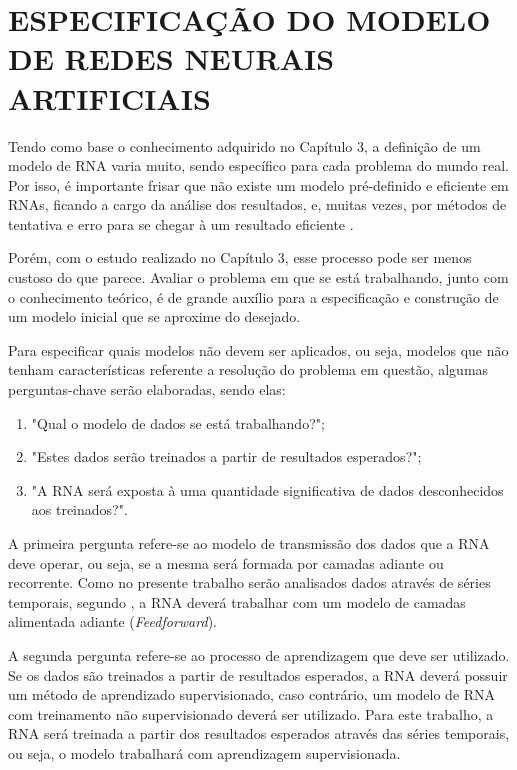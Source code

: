 \section{ESPECIFICAÇÃO DO MODELO DE REDES NEURAIS ARTIFICIAIS}\label{especifica-modelo}
Tendo como base o conhecimento adquirido no Capítulo 3, a definição de um modelo de RNA varia muito, sendo específico para cada problema do mundo real. Por isso, é importante frisar que não existe um modelo pré-definido e eficiente em RNAs, ficando a cargo da análise dos resultados, e, muitas vezes, por métodos de tentativa e erro para se chegar à um resultado eficiente \cite{haykin2000}.
 
Porém, com o estudo realizado no Capítulo 3, esse processo pode ser menos custoso do que parece. Avaliar o problema em que se está trabalhando, junto com o conhecimento teórico, é de grande auxílio para a especificação e construção de um modelo inicial que se aproxime do desejado.

Para especificar quais modelos não devem ser aplicados, ou seja, modelos que não tenham características referente a resolução do problema em questão, algumas perguntas-chave serão elaboradas, sendo elas:

\begin{enumerate}\label{enumerate-questions}
\item "Qual o modelo de dados se está trabalhando?";
\item "Estes dados serão treinados a partir de resultados esperados?";
\item "A RNA será exposta à uma quantidade significativa de dados desconhecidos aos treinados?".
\end{enumerate}

A primeira pergunta refere-se ao modelo de transmissão dos dados que a RNA deve operar, ou seja, se a mesma será formada por camadas adiante ou recorrente. Como no presente trabalho serão analisados dados através de séries temporais, segundo , a RNA deverá trabalhar com um modelo de camadas alimentada adiante (\textit{Feedforward}).

A segunda pergunta refere-se ao processo de aprendizagem que deve ser utilizado. Se os dados são treinados a partir de resultados esperados, a RNA deverá possuir um método de aprendizado supervisionado, caso contrário, um modelo de RNA com treinamento não supervisionado deverá ser utilizado. Para este trabalho, a RNA será treinada a partir dos resultados esperados através das séries temporais, ou seja, o modelo trabalhará com aprendizagem supervisionada.

